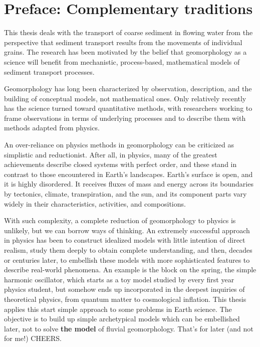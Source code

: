 
\chapter{Preface: Complementary traditions}

This thesis deals with the transport of coarse sediment in flowing water from the perspective that sediment transport results from the movements of individual grains.
The research has been motivated by the belief that geomorphology as a science will benefit from mechanistic, process-based, mathematical models of sediment transport processes.

Geomorphology has long been characterized by observation, description, and the building of conceptual models, not mathematical ones.
Only relatively recently has the science turned toward quantitative methods, with researchers working to frame observations in terms of underlying processes and to describe them with methods adapted from physics.

An over-reliance on physics methods in geomorphology can be criticized as simplistic and reductionist.
After all, in physics, many of the greatest achievements describe closed systems with perfect order, and these stand in contrast to those encountered in Earth's landscapes.
Earth's surface is open, and it is highly disordered.
It receives fluxes of mass and energy across its boundaries by tectonics, climate, transpiration, and the sun, and its component parts vary widely in their characteristics, activities, and compositions.

With such complexity, a complete reduction of geomorphology to physics is unlikely, but we can borrow ways of thinking.
An extremely successful approach in physics has been to construct idealized models with little intention of direct realism, study them deeply to obtain complete understanding, and then, decades or centuries later, to embellish these models with more sophisticated features to describe real-world phenomena.
An example is the block on the spring, the simple harmonic oscillator, which starts as a toy model studied by every first year physics student, but somehow ends up incorporated in the deepest inquiries of theoretical physics, from quantum matter to cosmological inflation.
This thesis applies this start simple approach to some problems in Earth science.
The objective is to build up simple archetypical models which can be embellished later, not to solve \textbf{the model} of fluvial geomorphology. 
That's for later (and not for me!) CHEERS.
